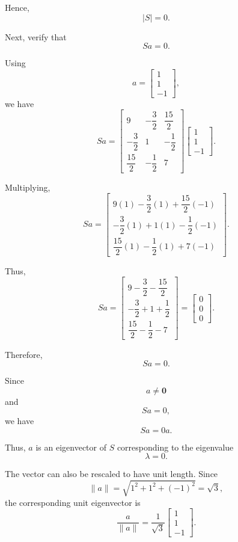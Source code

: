\documentclass[12pt]{article}
\begin{document}
	Hence,
	\[
	\boxed{|S|=0}.
	\]
	
	Next, verify that
	\[
	Sa=0.
	\]
	
	Using
	\[
	a=
	\begin{bmatrix}
		1\\1\\-1
	\end{bmatrix},
	\]
	we have
	\[
	Sa
	=
	\begin{bmatrix}
		9&-\dfrac32&\dfrac{15}{2}\\[5pt]
		-\dfrac32&1&-\dfrac12\\[5pt]
		\dfrac{15}{2}&-\dfrac12&7
	\end{bmatrix}
	\begin{bmatrix}
		1\\1\\-1
	\end{bmatrix}.
	\]
	
	Multiplying,
	\[
	Sa
	=
	\begin{bmatrix}
		9(1)-\dfrac32(1)+\dfrac{15}{2}(-1)
		\\[5pt]
		-\dfrac32(1)+1(1)-\dfrac12(-1)
		\\[5pt]
		\dfrac{15}{2}(1)-\dfrac12(1)+7(-1)
	\end{bmatrix}.
	\]
	
	Thus,
	\[
	Sa
	=
	\begin{bmatrix}
		9-\dfrac32-\dfrac{15}{2}\\[5pt]
		-\dfrac32+1+\dfrac12\\[5pt]
		\dfrac{15}{2}-\dfrac12-7
	\end{bmatrix}
	=
	\begin{bmatrix}
		0\\0\\0
	\end{bmatrix}.
	\]
	
	Therefore,
	\[
	\boxed{Sa=0}.
	\]
	
	Since
	\[
	a\neq\mathbf{0}
	\]
	and
	\[
	Sa=0,
	\]
	we have
	\[
	Sa=0a.
	\]
	
	Thus, \(a\) is an eigenvector of \(S\) corresponding to the
	eigenvalue
	\[
	\boxed{\lambda=0}.
	\]
	
	The vector can also be rescaled to have unit length. Since
	\[
	\|a\|
	=
	\sqrt{1^2+1^2+(-1)^2}
	=
	\sqrt{3},
	\]
	the corresponding unit eigenvector is
	\[
	\boxed{
		\frac{a}{\|a\|}
		=
		\frac{1}{\sqrt{3}}
		\begin{bmatrix}
			1\\1\\-1
	\end{bmatrix}}.
	\]
	
\end{document}
